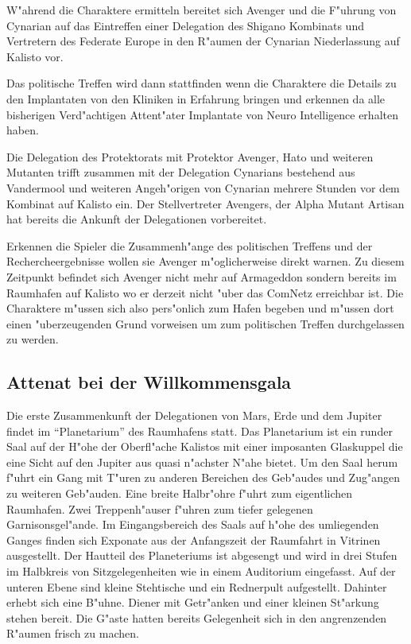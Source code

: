W"ahrend die Charaktere ermitteln bereitet sich Avenger und die F"uhrung von Cynarian auf das Eintreffen einer Delegation des Shigano Kombinats und Vertretern des Federate Europe in den R"aumen der Cynarian Niederlassung auf Kalisto vor.

Das politische Treffen wird dann stattfinden wenn die Charaktere die Details zu den Implantaten von den Kliniken in
Erfahrung bringen und erkennen da\3 alle bisherigen Verd"achtigen Attent"ater Implantate von Neuro Intelligence
erhalten haben.

Die Delegation des Protektorats mit Protektor Avenger, Hato und weiteren Mutanten trifft zusammen mit der Delegation Cynarians bestehend aus Vandermool und weiteren Angeh"origen von Cynarian mehrere Stunden vor dem Kombinat auf Kalisto
ein. Der Stellvertreter Avengers, der Alpha Mutant Artisan hat bereits die Ankunft der Delegationen vorbereitet.

\begin{remarks}
Erkennen die Spieler die Zusammenh"ange des politischen Treffens und der Rechercheergebnisse wollen sie Avenger m"oglicherweise direkt warnen. Zu diesem Zeitpunkt befindet sich Avenger nicht mehr auf Armageddon sondern bereits im Raumhafen auf Kalisto wo er derzeit nicht "uber das ComNetz erreichbar ist. Die Charaktere m"ussen sich also pers"onlich zum Hafen begeben und m"ussen dort einen "uberzeugenden Grund vorweisen um zum politischen Treffen durchgelassen zu werden.
\end{remarks}

\subsection{Attenat bei der Willkommensgala}

Die erste Zusammenkunft der Delegationen von Mars, Erde und dem Jupiter findet im ``Planetarium'' des Raumhafens statt. Das Planetarium ist ein runder Saal auf der H"ohe der Oberfl"ache Kalistos mit einer imposanten Glaskuppel die eine Sicht auf den Jupiter aus quasi n"achster N"ahe bietet. Um den Saal herum f"uhrt ein Gang mit T"uren zu anderen Bereichen des Geb"audes und Zug"angen zu weiteren Geb"auden. Eine breite Halbr"ohre f"uhrt zum eigentlichen Raumhafen. Zwei Treppenh"auser f"uhren zum tiefer gelegenen Garnisonsgel"ande. Im Eingangsbereich des Saals auf h"ohe des umliegenden Ganges finden sich Exponate aus der Anfangszeit der Raumfahrt in Vitrinen ausgestellt. Der Hautteil des Planeteriums ist abgesengt und wird in drei Stufen im Halbkreis von Sitzgelegenheiten wie in einem Auditorium eingefasst. Auf der unteren Ebene sind kleine Stehtische und ein Rednerpult aufgestellt. Dahinter erhebt sich eine B"uhne. Diener mit Getr"anken und einer kleinen St"arkung stehen bereit. Die G"aste hatten bereits Gelegenheit sich in den angrenzenden R"aumen frisch zu machen.


